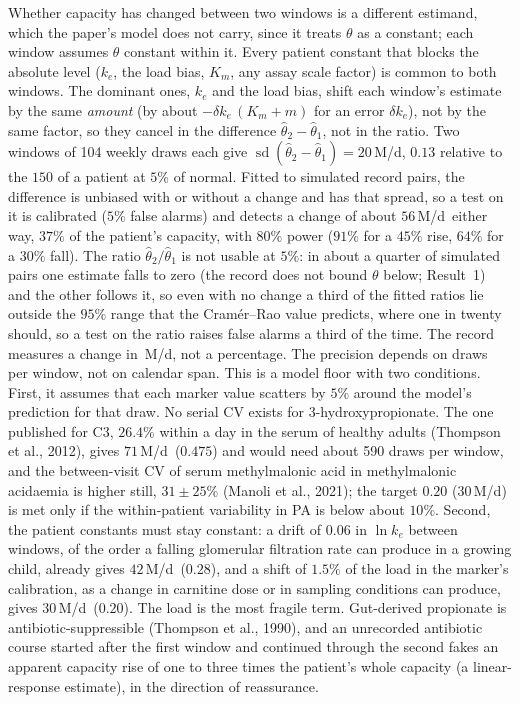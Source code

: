 \documentclass[11pt,a4paper]{article}
\newcommand{\um}{\,\textmu M/d}
\begin{document}
Whether capacity has changed between two windows is a different estimand, which the paper's
model does not carry, since it treats $\theta$ as a constant; each window assumes $\theta$
constant within it. Every patient constant that blocks the absolute level ($k_e$, the load bias,
$K_m$, any assay scale factor) is common to both windows. The dominant ones, $k_e$ and the load
bias, shift each window's estimate by the same \emph{amount} (by about $-\delta k_e\,(K_m+m)$ for an
error $\delta k_e$), not by the same factor, so they cancel in the difference
$\hat\theta_2-\hat\theta_1$, not in the ratio. Two windows of 104 weekly draws each give
$\operatorname{sd}(\hat\theta_2-\hat\theta_1)=20$\um, $0.13$ relative to the $150$ of a patient at
$5\%$ of normal. Fitted to simulated record pairs, the difference is unbiased with or without a
change and has that spread, so a test on it is calibrated ($5\%$ false alarms) and detects a change
of about $56$\um\ either way, $37\%$ of the patient's capacity, with $80\%$ power ($91\%$ for a
$45\%$ rise, $64\%$ for a $30\%$ fall). The ratio $\hat\theta_2/\hat\theta_1$ is not usable at $5\%$:
in about a quarter of simulated pairs one estimate falls to zero (the record does not bound
$\theta$ below; Result~1) and the other follows it, so even with no change a third of the fitted
ratios lie outside the $95\%$ range that the Cram\'er--Rao value predicts, where one in twenty should, so a test on the ratio raises false alarms a third of the time. The record measures a change in
\um, not a percentage. The precision depends on draws per window, not on calendar span. This is a
model floor with two conditions. First, it assumes that each marker value scatters by $5\%$
around the model's prediction for that draw. No serial CV exists for 3-hydroxypropionate. The
one published for C3, $26.4\%$ within a day in the serum of healthy adults (Thompson et al.,
2012), gives $71$\um\ ($0.475$) and would need about 590 draws per window, and the between-visit CV
of serum methylmalonic acid in methylmalonic acidaemia is higher still, $31\pm25\%$ (Manoli et
al., 2021); the target $0.20$ ($30$\um) is met only if the within-patient variability in PA is
below about $10\%$. Second, the patient constants must stay constant: a drift of $0.06$ in
$\ln k_e$ between windows, of the order a falling glomerular filtration rate can produce in a
growing child, already gives $42$\um\ ($0.28$), and a shift of $1.5\%$ of the load in the marker's
calibration, as a change in carnitine dose or in sampling conditions can produce, gives $30$\um\
($0.20$). The load is the most fragile term. Gut-derived propionate is antibiotic-suppressible
(Thompson et al., 1990), and an unrecorded antibiotic course started after the first window and
continued through the second fakes an apparent capacity rise of one to three times the patient's
whole capacity (a linear-response estimate), in the direction of reassurance.
\end{document}
